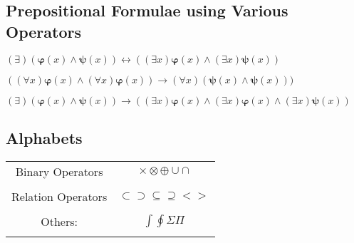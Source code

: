 \documentclass[12pt,a4paper]{article}
\begin{document}
\subsection{Prepositional Formulae using Various Operators}

 
\vspace*{0.5cm}
\hspace*{0.5cm}
$(\exists)(\boldsymbol{\varphi}(x)\wedge\boldsymbol{\psi}(x))\leftrightarrow((\exists x)\boldsymbol{\varphi}(x)\wedge(\exists x)\boldsymbol{\psi}(x))$
\vspace*{0.5cm}
\hspace*{0cm}

$((\forall x)\boldsymbol{\varphi}(x)\wedge(\forall x)\boldsymbol{\varphi}(x))\rightarrow(\forall x)(\boldsymbol{\psi}(x)\wedge\boldsymbol{\psi}(x)))$
\vspace*{0.5cm}
\hspace*{0cm}

${(\exists)(\boldsymbol{\varphi}(x)\wedge\boldsymbol{\psi}(x))\rightarrow((\exists x)\boldsymbol{\varphi}(x)\wedge(\exists x)\boldsymbol{\varphi}(x)\wedge(\exists x)\boldsymbol{\psi}(x)) }$

 
\subsection{Alphabets}
\vspace*{0.5cm}
\begin{center}
   \begin{tabular}{|c|c|}
	\hline
     Binary Operators & $\times \otimes \oplus \cup \cap$ \\
	& \\
	\hline
     Relation Operators & $\subset \supset \subseteq \supseteq < >$ \\
	& \\	
	\hline
     Others: & $\int \oint \Sigma \Pi$ \\
	& \\	
	\hline
   \end{tabular}
\end{center}
\vspace*{0.5cm}
\end{document}
